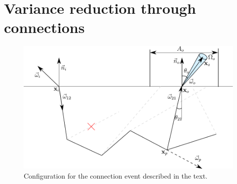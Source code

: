 \documentclass[10pt,a4paper]{article}
\begin{document}
\section{Variance reduction through connections}
\begin{figure}[h]
\includegraphics[scale=0.7]{configuration.pdf} 
\caption{Configuration for the connection event described in the text.}
\label{fig:diagram}
\end{figure}
\end{document}
